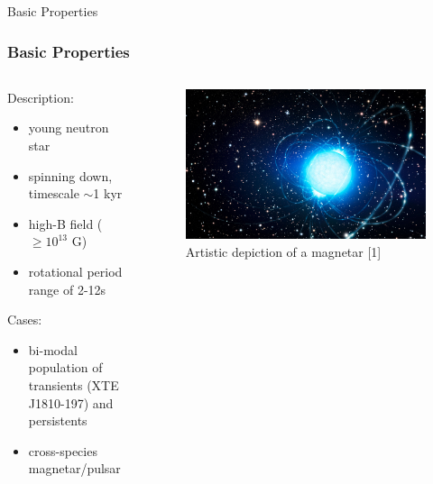 \documentclass[hyperref=pdftex, presentation]{beamer}
\begin{document}
\begin{frame}{\Large Basic Properties}
\frametitle{\Large Basic Properties}

\begin{minipage}[0.2\textheight]{\textwidth}
\begin{columns}[T]
\begin{column}{0.5\textwidth}

\begin{block}{Description:}

\begin{itemize}
 \item<2-> young neutron star%
 \item<3-> spinning down, timescale $\sim$1 kyr %
 \item<4-> high-B field ($\ge 10^{13}$ G)
 \item<5-> rotational period range of 2-12s %
\end{itemize}
\end{block}
\begin{block}{Cases:}

\begin{itemize}
 \item<6-> bi-modal population of transients (XTE
J1810-197) and persistents%
 \item<7-> cross-species magnetar/pulsar
\end{itemize}
\end{block}
\end{column}
\begin{column}{0.5\textwidth}
	\begin{figure}
		\includegraphics[scale=.09]{figures/magnetar_art.jpg}
		\caption{Artistic depiction of a magnetar [1]}
	\end{figure}
\end{column}
\end{columns}
\end{minipage}

\end{frame}
\end{document}
